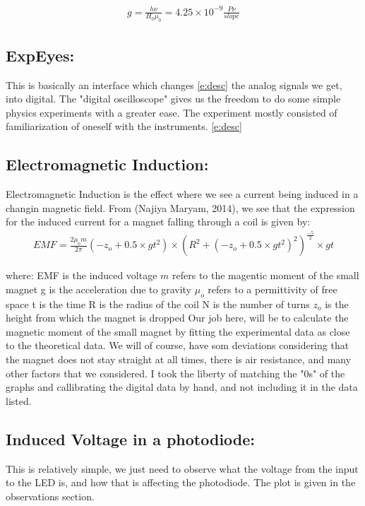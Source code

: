 \documentclass{double}
\begin{document}
\begin{align}
 g=\frac{h \nu}{H_0 \mu_0} = 4.25\times10^{-9} \frac{P \nu}{slope} 
\end{align}


\subsection{ExpEyes:}
This is basically an interface which changes \ref{e:desc} the analog signals we get, into digital. The "digital oscilloscope" gives us the freedom to do some simple physics experiments with a greater ease. The experiment mostly consisted of familiarization of oneself with the instruments. \ref{e:desc}

\subsection{Electromagnetic Induction:}
Electromagnetic Induction is the effect where we see a current being induced in a changin magnetic field. From (Najiya Maryam, 2014), we see that the expression for the induced current for a magnet falling through a coil is given by:
\begin{align}
 EMF = \frac{2\mu_o m}{2\pi}(-z_o+0.5\times gt^2) \times (R^2+(-z_o+0.5\times gt^2)^2)^\frac{-5}{2}\times gt 
\end{align}

where:  
EMF is the induced voltage  
$m$ refers to the magentic moment of the small magnet  
g is the acceleration due to gravity  
$\mu_o$ refers to a permittivity of free space  
t is the time  
R is the radius of the coil  
N is the number of turns  
$z_o$ is the height from which the magnet is dropped  
Our job here, will be to calculate the magnetic moment of the small magnet by fitting the experimental data as close to the theoretical data. We will of course, have som deviations considering that the magnet does not stay straight at all times, there is air resistance, and many other factors that we considered. I took the liberty of matching the "0s" of the graphs and callibrating the digital data by hand, and not including it in the data listed.

\subsection{Induced Voltage in a photodiode:}
This is relatively simple, we just need to observe what the voltage from the input to the LED is, and how that is affecting the photodiode. The plot is given in the observations section.
\end{document}
